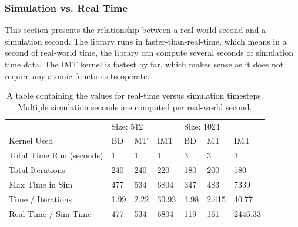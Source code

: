 \subsubsection{Simulation vs. Real Time}
This section presents the relationship between a real-world second and a simulation second. The library runs in faster-than-real-time, which means in a second of real-world time, the library can compute several seconds of simulation time data. The IMT kernel is fastest by far, which makes sense as it does not require any atomic functions to operate. 
\begin{table}[]
\centering
\caption{A table containing the values for real-time versus simulation timesteps. Multiple simulation seconds are computed per real-world second.}
\label{table:time_comp}
\begin{tabular}{lllllll}
                         & \multicolumn{3}{l}{Size: 512} & \multicolumn{3}{l}{Size: 1024} \\
Kernel Used              & BD       & MT      & IMT      & BD      & MT       & IMT       \\
Total Time Run (seconds) & 1        & 1       & 1        & 3       & 3        & 3         \\
Total Iterations         & 240      & 240     & 220      & 180     & 200      & 180       \\
Max Time in Sim          & 477      & 534     & 6804     & 347     & 483      & 7339      \\
Time / Iterations        & 1.99     & 2.22    & 30.93    & 1.98    & 2.415    & 40.77     \\
Real Time / Sim Time     & 477      & 534     & 6804     & 119     & 161      & 2446.33  
\end{tabular}
\end{table}

